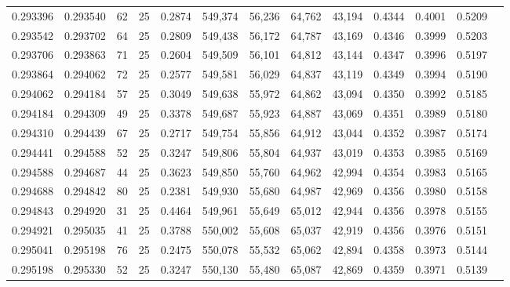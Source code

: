 \begin{tabular}{rrrrrrrrrrrrr}
0.293396 & 0.293540 &    62 &  25 &                                     0.2874 & 549,374 &  56,236 &  64,762 &  43,194 & 0.4344 & 0.4001 & 0.5209 \\
0.293542 & 0.293702 &    64 &  25 &                                     0.2809 & 549,438 &  56,172 &  64,787 &  43,169 & 0.4346 & 0.3999 & 0.5203 \\
0.293706 & 0.293863 &    71 &  25 &                                     0.2604 & 549,509 &  56,101 &  64,812 &  43,144 & 0.4347 & 0.3996 & 0.5197 \\
0.293864 & 0.294062 &    72 &  25 &                                     0.2577 & 549,581 &  56,029 &  64,837 &  43,119 & 0.4349 & 0.3994 & 0.5190 \\
0.294062 & 0.294184 &    57 &  25 &                                     0.3049 & 549,638 &  55,972 &  64,862 &  43,094 & 0.4350 & 0.3992 & 0.5185 \\
0.294184 & 0.294309 &    49 &  25 &                                     0.3378 & 549,687 &  55,923 &  64,887 &  43,069 & 0.4351 & 0.3989 & 0.5180 \\
0.294310 & 0.294439 &    67 &  25 &                                     0.2717 & 549,754 &  55,856 &  64,912 &  43,044 & 0.4352 & 0.3987 & 0.5174 \\
0.294441 & 0.294588 &    52 &  25 &                                     0.3247 & 549,806 &  55,804 &  64,937 &  43,019 & 0.4353 & 0.3985 & 0.5169 \\
0.294588 & 0.294687 &    44 &  25 &                                     0.3623 & 549,850 &  55,760 &  64,962 &  42,994 & 0.4354 & 0.3983 & 0.5165 \\
0.294688 & 0.294842 &    80 &  25 &                                     0.2381 & 549,930 &  55,680 &  64,987 &  42,969 & 0.4356 & 0.3980 & 0.5158 \\
0.294843 & 0.294920 &    31 &  25 &                                     0.4464 & 549,961 &  55,649 &  65,012 &  42,944 & 0.4356 & 0.3978 & 0.5155 \\
0.294921 & 0.295035 &    41 &  25 &                                     0.3788 & 550,002 &  55,608 &  65,037 &  42,919 & 0.4356 & 0.3976 & 0.5151 \\
0.295041 & 0.295198 &    76 &  25 &                                     0.2475 & 550,078 &  55,532 &  65,062 &  42,894 & 0.4358 & 0.3973 & 0.5144 \\
0.295198 & 0.295330 &    52 &  25 &                                     0.3247 & 550,130 &  55,480 &  65,087 &  42,869 & 0.4359 & 0.3971 & 0.5139 \\

\end{tabular}

